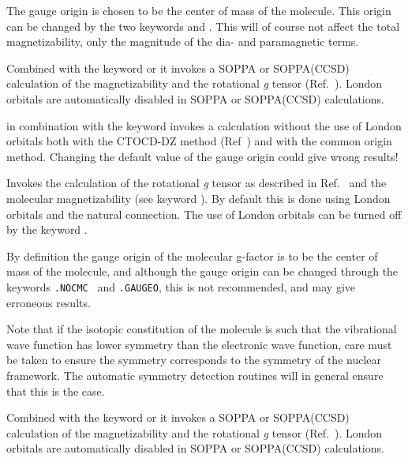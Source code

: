 \begin{description}
The gauge origin is chosen to be the center of
mass of the molecule.
This origin can be changed by the two keywords  and
. This will of course not affect the total magnetizability,
only the magnitude of the dia- and paramagnetic terms.

Combined with the keyword  or  it invokes a SOPPA
or SOPPA(CCSD) calculation of the magnetizability and the rotational
{\em g} tensor (Ref.~\cite{spascpl260}). London orbitals are automatically disabled in
SOPPA or SOPPA(CCSD) calculations.

 in combination with the keyword  invokes a
calculation without the use of London orbitals both with the CTOCD-DZ method
(Ref~\cite{paololazz1,paololazz2}) and with the common origin method.
Changing the default value of the gauge origin could give wrong results!


\item[\Key{MOLGFA}] Invokes the calculation of the rotational
{\em g} tensor as described in
Ref.~\cite{jgkrthjcp105} and the molecular
magnetizability (see keyword ). By
default this is done
using London orbitals  and the
natural connection. The use of London
orbitals can be turned off by the keyword .

By definition the gauge origin of the molecular
g-factor is to be the
center of mass of the molecule, and although the
gauge origin can be
changed through the keywords \verb|.NOCMC | and \verb|.GAUGEO|, this
is not recommended, and may give erroneous results.

Note that if the isotopic constitution of the molecule is such that
the vibrational wave function has lower symmetry than the electronic
wave function, care must be taken to ensure the symmetry corresponds
to the symmetry of the nuclear framework. The automatic symmetry
detection routines will in general ensure that this is the case.

Combined with the keyword  or  it invokes a SOPPA
or SOPPA(CCSD) calculation of the magnetizability and the
rotational {\em g} tensor (Ref.~\cite{spascpl260}). London orbitals are automatically
disabled in SOPPA or SOPPA(CCSD) calculations.


\end{description}
